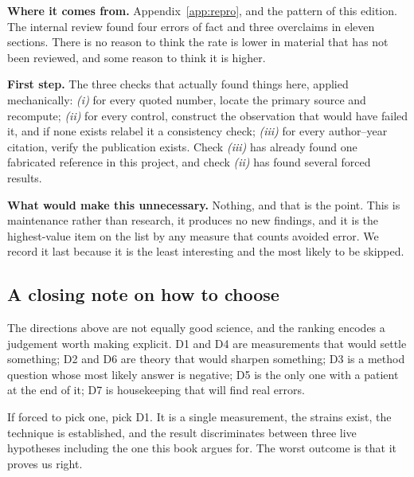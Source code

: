 \textbf{Where it comes from.} Appendix~\ref{app:repro}, and the pattern of this
edition. The internal review found four errors of fact and three overclaims in
eleven sections. There is no reason to think the rate is lower in material that
has not been reviewed, and some reason to think it is higher.

\textbf{First step.} The three checks that actually found things here, applied
mechanically: \emph{(i)} for every quoted number, locate the primary source and
recompute; \emph{(ii)} for every control, construct the observation that would
have failed it, and if none exists relabel it a consistency check;
\emph{(iii)} for every author--year citation, verify the publication exists.
Check \emph{(iii)} has already found one fabricated reference in this project,
and check \emph{(ii)} has found several forced results.

\textbf{What would make this unnecessary.} Nothing, and that is the point. This
is maintenance rather than research, it produces no new findings, and it is the
highest-value item on the list by any measure that counts avoided error. We
record it last because it is the least interesting and the most likely to be
skipped.

\subsection*{A closing note on how to choose}

The directions above are not equally good science, and the ranking encodes a
judgement worth making explicit. D1 and D4 are measurements that would settle
something; D2 and D6 are theory that would sharpen something; D3 is a method
question whose most likely answer is negative; D5 is the only one with a patient
at the end of it; D7 is housekeeping that will find real errors.

If forced to pick one, pick D1. It is a single measurement, the strains exist,
the technique is established, and the result discriminates between three live
hypotheses including the one this book argues for. The worst outcome is that it
proves us right.
